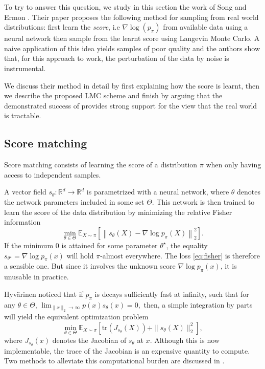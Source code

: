 \documentclass[11pt,twoside]{article}
\theoremstyle{definition}
\newcommand{\E}{\mathbb{E}}
\newcommand{\R}{\mathbb{R}}
\begin{document}
To try to answer this question, we study in this section the work of Song and Ermon \cite{song_generative_2019}. Their paper proposes the following method for sampling from real world distributions:  first learn the \textit{score}, i.e  $\nabla \log (p_\pi)$ from available data using a neural network then sample from the learnt score using Langevin Monte Carlo. A naive application of this idea yields samples of poor quality and the authors show that, for this approach to work, the perturbation of the data by noise is instrumental.

We discuss their method in detail by first explaining how the score is learnt, then we describe the proposed LMC scheme and finish by arguing that the demonstrated success of \cite{song_generative_2019} provides strong support for the view that the real world is tractable.

\subsection{Score matching}

Score matching consists of learning the score of a distribution $\pi$ when only having access to independent samples.

A vector field $s_\theta: \R^d \rightarrow \R^d$ is parametrized with a neural network, where $\theta$ denotes the network parameters included in some set $\Theta$. This network is then trained to learn the score of the data distribution by minimizing the relative Fisher information 
\begin{equation}
\min_{\theta \in \Theta} \E_{X \sim \pi} \left[ \left\| s_\theta(X) - \nabla \log p_\pi(X) \right\|_2^2\right].
\label{eq:fisher}
\end{equation}
If the minimum $0$ is attained for some parameter $\theta^\star$, the equality $s_{\theta^\star} = \nabla \log p_\pi(x)$ will hold $\pi$-almost everywhere. The loss \eqref{eq:fisher} is therefore a sensible one. But since it involves the unknown score $\nabla \log p_\pi(x)$, it is unusable in practice.

Hyv\"arinen \cite{hyvarinen_estimation_2005} noticed that if $p_\pi$ is decays sufficiently fast at infinity, such that for any $\theta \in \Theta$,
\(
 \lim_{\|x\|_2 \rightarrow \infty} p(x)s_\theta(x) =0,
\)
then, a simple integration by parts will yield the equivalent optimization problem
\begin{equation}
\min_{\theta \in \Theta} \E_{X \sim \pi} \left[ \text{tr}(J_{s_\theta}(X)) + \|s_\theta(X)\|_2^2\right],
\label{eq:tractable-score}
\end{equation}
where $J_{s_\theta}(x)$ denotes the Jacobian of $s_\theta$ at $x$. Although this is now implementable, the trace of the Jacobian is an expensive quantity to compute. Two methods to alleviate this computational burden are discussed in \cite{song_generative_2019}.
\end{document}
